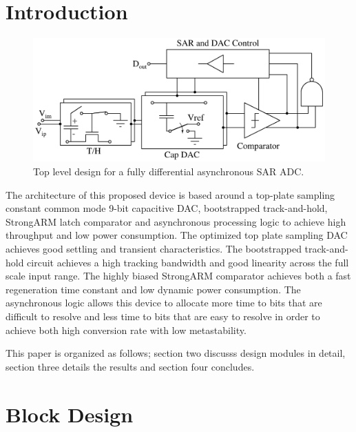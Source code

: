 \documentclass[10pt,journal]{IEEEtran}\usepackage{longtable}
\begin{document}
\section{Introduction}
\begin{figure}[b]
\begin{center}
\includegraphics[width=1\columnwidth]{TopLevel.pdf}
\caption{Top level design for a fully differential asynchronous SAR ADC.}
\label{fig:TopLevel}
\end{center}
\end{figure}
The architecture of this proposed device is based around a top-plate sampling constant common mode 9-bit capacitive DAC, bootstrapped track-and-hold, StrongARM latch comparator and asynchronous processing logic to achieve high throughput and low power consumption. The optimized top plate sampling DAC achieves good settling and transient characteristics. The bootstrapped track-and-hold circuit achieves a high tracking bandwidth and good linearity across the full scale input range. The highly biased StrongARM comparator achieves both a fast regeneration time constant and low dynamic power consumption. The asynchronous logic allows this device to allocate more time to bits that are difficult to resolve and less time to bits that are easy to resolve in order to achieve both high conversion rate with low metastability.

This paper is organized as follows; section two discusss design modules in detail, section three details the results and section four concludes.


\section{Block Design}
\end{document}
